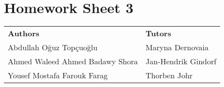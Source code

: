 \documentclass{article}
\begin{document}
\section*{\huge Homework Sheet 3}
\begin{flushright}
  \begin{tabular}{@{} l l @{}}
    \textbf{Authors} & \textbf{Tutors} \\
    Abdullah Oğuz Topçuoğlu & Maryna Dernovaia \\
    Ahmed Waleed Ahmed Badawy Shora & Jan-Hendrik Gindorf \\
    Yousef Mostafa Farouk Farag&
    Thorben Johr \\
  \end{tabular}
\end{flushright}

\end{document}
